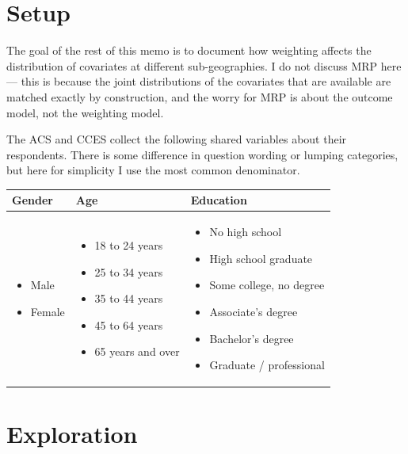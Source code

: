 \documentclass[11pt]{article}
\begin{document}
\section*{Setup}

The goal of the rest of this memo is to document how weighting affects the distribution of covariates at different sub-geographies. I do not discuss MRP here --- this is because the joint distributions of the covariates that are available are matched exactly by construction, and the worry for MRP is about the outcome model, not the weighting model.

The ACS and CCES collect the following shared variables about their respondents. There is some difference in question wording or lumping categories, but here for simplicity I use the most common denominator.


\begin{table}[!h]
\small
\begin{tabularx}{\linewidth}{XXX}
Gender & Age & Education\\\midrule
\begin{itemize}
\item Male
\item Female
\end{itemize} &
\begin{itemize}
\item 18 to 24 years
\item 25 to 34 years
\item 35 to 44 years
\item 45 to 64 years
\item 65 years and over
\end{itemize} &
\begin{itemize}
\item No high school
\item High school graduate
\item Some college, no degree
\item Associate's degree
\item Bachelor's degree
\item Graduate / professional
\end{itemize}
\end{tabularx}
\end{table}


\section*{Exploration}
\end{document}
